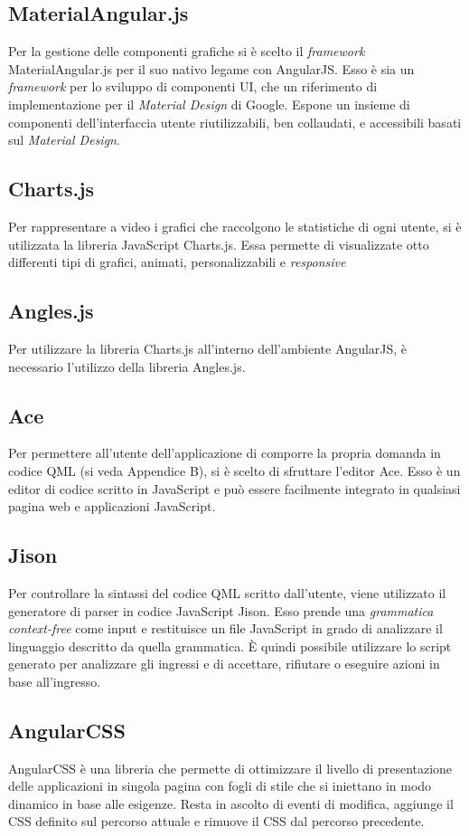 \subsection{MaterialAngular.js}
Per la gestione delle componenti grafiche si è scelto il \textit{framework} MaterialAngular.js per il suo nativo legame con AngularJS. Esso è sia un \textit{framework} per lo sviluppo di componenti UI, che un riferimento di implementazione per il \textit{Material Design} di Google. Espone un insieme di componenti dell'interfaccia utente riutilizzabili, ben collaudati, e accessibili basati sul \textit{Material Design}.
\subsection{Charts.js}
Per rappresentare a video i grafici che raccolgono le statistiche di ogni utente, si è utilizzata la libreria JavaScript Charts.js. Essa permette di visualizzate otto differenti tipi di grafici, animati, personalizzabili e \textit{responsive} 
\subsection{Angles.js}
Per utilizzare la libreria Charts.js all'interno dell'ambiente AngularJS, è necessario l'utilizzo della libreria Angles.js.
\subsection{Ace}
Per permettere all'utente dell'applicazione \progetto{} di comporre la propria domanda in codice QML (si veda Appendice B), si è scelto di sfruttare l'editor Ace. Esso è un editor di codice scritto in JavaScript e può essere facilmente integrato in qualsiasi pagina web e applicazioni JavaScript.
\subsection{Jison}
Per controllare la sintassi del codice QML scritto dall'utente, viene utilizzato il generatore di parser in codice JavaScript Jison. Esso prende una \textit{grammatica context-free} come input e restituisce un file JavaScript in grado di analizzare il linguaggio descritto da quella grammatica. È quindi possibile utilizzare lo script generato per analizzare gli ingressi e di accettare, rifiutare o eseguire azioni in base all'ingresso.
\subsection{AngularCSS}
AngularCSS è una libreria che permette di ottimizzare il livello di presentazione delle applicazioni in singola pagina con fogli di stile che si iniettano in modo dinamico in base alle esigenze. Resta in ascolto di eventi di modifica, aggiunge il CSS definito sul percorso attuale e rimuove il CSS dal percorso precedente.
